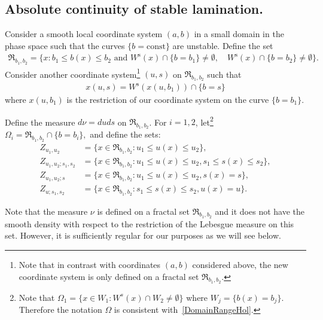 \documentclass[10pt]{amsart}
\theoremstyle{definition}\newtheorem{defi}[theo]{Definition}\newtheorem{rema}[theo]{Remark}\newtheorem{exam}[theo]{Example}\newtheorem{exem}[theo]{Example}\newtheorem{nota}[theo]{Notation}
\newcommand{\stable}{\text{s}}
\newcommand{\Rect}{{\mathfrak{R}}}
\newcommand{\Ws}{W^{\stable}}
\begin{document}
\subsection{Absolute continuity of stable lamination.} Consider a smooth local coordinate system $(a, b)$ in a small domain in the phase space such that the curves $\{b=\text{const}\}$ are unstable. Define the set
\begin{align*}
\Rect_{b_1, b_2}=\{ x: b_1\leq b(x)\leq b_2\text{ and }
\Ws(x) \cap \{b=b_1\}\neq\emptyset, \quad
\Ws(x) \cap \{b=b_2\}\neq\emptyset \}.
\end{align*}
Consider another coordinate system\footnote{Note that in contrast with coordinates $(a,b)$ considered above, the new coordinate system is only defined on a fractal set $\Rect_{b_1, b_2}$.} $(u,s)$ on $\Rect_{b_1, b_2}$ such that
\begin{align*}
x(u,s)=\Ws(x(u, b_1))\cap \{b=s\}
\end{align*}
where $x(u, b_1)$ is the restriction of our coordinate system on the curve $\{b=b_1\}.$


Define the measure $d\nu=du ds$ on $\Rect_{b_1, b_2}$. For $i = 1, 2$, let\footnote{Note that $\Omega_1=\{x\in W_1: W^s(x)\cap W_2\neq \emptyset\}$ where $W_j=\{b(x)=b_j\}.$ Therefore the notation $\Omega$ is consistent with~\eqref{DomainRangeHol}.}\\
$\Omega_i=\Rect_{b_1, b_2} \cap \{b=b_i\},$ and define the sets:
\begin{align*}
Z_{u_1, u_2}&=\{x\in \Rect_{b_1, b_2}: u_1\leq u(x) \leq u_2\},\\
Z_{u_1, u_2; s_1, s_2}&=\{x\in \Rect_{b_1, b_2}: u_1\leq u(x) \leq u_2, s_1\leq s(x) \leq s_2\},\\
Z_{u_1, u_2;s}&=\{x\in \Rect_{b_1, b_2}: u_1\leq u(x) \leq u_2, s(x)=s\},\\
Z_{u;s_1, s_2}&=\{x\in \Rect_{b_1, b_2}: s_1\leq s(x) \leq s_2, u(x)=u\}.
\end{align*}

Note that the measure $\nu$ is defined on a fractal set $\Rect_{b_1, b_2}$ and it does not have the smooth density with respect to the restriction of the Lebesgue measure on this set. However, it is sufficiently regular for our purposes as we will see below.
\end{document}
